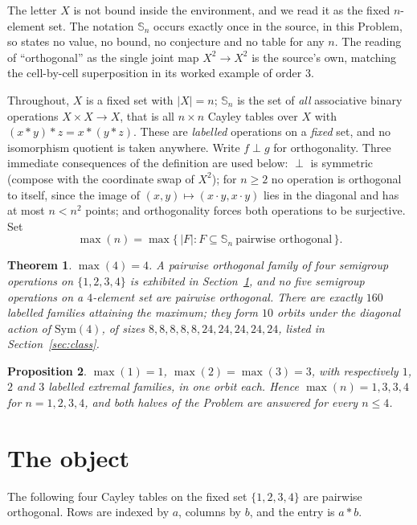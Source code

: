 \documentclass[11pt]{amsart}
\newtheorem{theorem}{Theorem}
\newtheorem{proposition}[theorem]{Proposition}
\theoremstyle{remark}
\theoremstyle{definition}
\newcommand{\Sops}{\mathbb S}
\begin{document}
The letter $X$ is not bound inside the environment, and we read it as the fixed $n$-element set. The
notation $\Sops_n$ occurs exactly once in the source, in this Problem, so \cite{ABCHK} states no
value, no bound, no conjecture and no table for any $n$. The reading of ``orthogonal'' as the single
joint map $X^2\to X^2$ is the source's own, matching the cell-by-cell superposition in its worked
example of order $3$.

Throughout, $X$ is a fixed set with $|X|=n$; $\Sops_n$ is the set of \emph{all} associative binary
operations $X\times X\to X$, that is all $n\times n$ Cayley tables over $X$ with
$(x*y)*z=x*(y*z)$. These are \emph{labelled} operations on a \emph{fixed} set, and no isomorphism
quotient is taken anywhere. Write $f\perp g$ for orthogonality. Three immediate consequences of the
definition are used below: $\perp$ is symmetric (compose with the coordinate swap of $X^2$); for
$n\ge2$ no operation is orthogonal to itself, since the image of $(x,y)\mapsto(x\cdot y,x\cdot y)$
lies in the diagonal and has at most $n<n^2$ points; and orthogonality forces both operations to be
surjective. Set
\[
  \max(n)=\max\{\,|F| : F\subseteq\Sops_n\ \text{pairwise orthogonal}\,\}.
\]

\begin{theorem}\label{thm:main}
$\max(4)=4$. A pairwise orthogonal family of four semigroup operations on $\{1,2,3,4\}$ is exhibited
in Section~\ref{sec:obj}, and no five semigroup operations on a $4$-element set are pairwise
orthogonal. There are exactly $160$ labelled families attaining the maximum; they form $10$ orbits
under the diagonal action of $\mathrm{Sym}(4)$, of sizes $8,8,8,8,8,24,24,24,24,24$, listed in
Section~\ref{sec:class}.
\end{theorem}

\begin{proposition}\label{prop:small}
$\max(1)=1$, $\max(2)=\max(3)=3$, with respectively $1$, $2$ and $3$ labelled extremal families, in
one orbit each. Hence $\max(n)=1,3,3,4$ for $n=1,2,3,4$, and both halves of the Problem are answered
for every $n\le4$.
\end{proposition}

\section{The object}\label{sec:obj}

The following four Cayley tables on the fixed set $\{1,2,3,4\}$ are pairwise orthogonal. Rows are
indexed by $a$, columns by $b$, and the entry is $a*b$.
\end{document}
